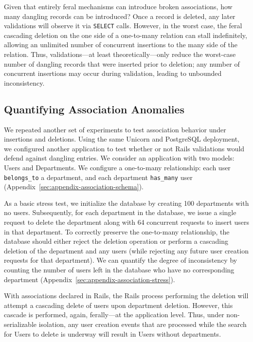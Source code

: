  Given that entirely
feral mechanisms can introduce broken associations, how many dangling
records can be introduced? Once a record is deleted, any later
validations will observe it via \texttt{SELECT} calls. However, in the
worst case, the feral cascading deletion on the one side of a
one-to-many relation can stall indefinitely, allowing an unlimited
number of concurrent insertions to the many side of the
relation. Thus, validations---at least theoretically---only reduce the
worst-case number of dangling records that were inserted prior to
deletion; any number of concurrent insertions may occur during
validation, leading to unbounded inconsistency.

\subsection{Quantifying Association Anomalies}

We repeated another set of experiments to test association behavior
under insertions and deletions. Using the same Unicorn and PostgreSQL
deployment, we configured another application to test whether or not
Rails validations would defend against dangling entries. We consider
an application with two models: Users and Departments. We configure a
one-to-many relationship: each user \texttt{belongs\_to} a department,
and each department \texttt{has\_many} user
(Appendix~\ref{sec:appendix-association-schema}).

As a basic stress test, we initialize the database by creating 100
departments with no users. Subsequently, for each department in the
database, we issue a single request to delete the department along
with 64 concurrent requests to insert users in that department. To
correctly preserve the one-to-many relationship, the database should
either reject the deletion operation or perform a cascading deletion
of the department and any users (while rejecting any future user
creation requests for that department). We can quantify the degree of
inconsistency by counting the number of users left in the database who
have no corresponding department (Appendix~\ref{sec:appendix-association-stress}).

With associations declared in Rails, the Rails process performing the
deletion will attempt a cascading delete of users upon department
deletion. However, this cascade is performed, again, ferally---at the
application level. Thus, under non-serializable isolation, any user creation
events that are processed while the search for Users to delete is
underway will result in Users without departments.

